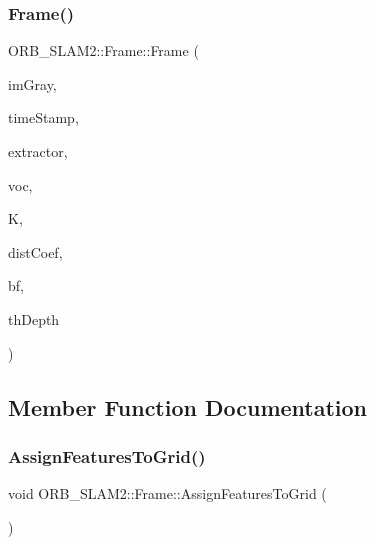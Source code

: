 \mbox{\label{class_o_r_b___s_l_a_m2_1_1_frame_a39a57316938495a9ca8a053edd74b414}} 
\subsubsection{\texorpdfstring{Frame()}{Frame()}\hspace{0.1cm}{\footnotesize\ttfamily [5/5]}}
{\footnotesize\ttfamily O\+R\+B\+\_\+\+S\+L\+A\+M2\+::\+Frame\+::\+Frame (\begin{DoxyParamCaption}\item[{const cv\+::\+Mat \&}]{im\+Gray,  }\item[{const double \&}]{time\+Stamp,  }\item[{\mbox{\hyperlink{class_o_r_b___s_l_a_m2_1_1_o_r_bextractor}{O\+R\+Bextractor}} $\ast$}]{extractor,  }\item[{\mbox{\hyperlink{namespace_o_r_b___s_l_a_m2_a2fafba714858cab1bb18d438e2e83c5d}{O\+R\+B\+Vocabulary}} $\ast$}]{voc,  }\item[{cv\+::\+Mat \&}]{K,  }\item[{cv\+::\+Mat \&}]{dist\+Coef,  }\item[{const float \&}]{bf,  }\item[{const float \&}]{th\+Depth }\end{DoxyParamCaption})}



\subsection{Member Function Documentation}
\mbox{\label{class_o_r_b___s_l_a_m2_1_1_frame_aa3ba21cd44638b322db024cba2b9c19e}} 
\subsubsection{\texorpdfstring{Assign\+Features\+To\+Grid()}{AssignFeaturesToGrid()}}
{\footnotesize\ttfamily void O\+R\+B\+\_\+\+S\+L\+A\+M2\+::\+Frame\+::\+Assign\+Features\+To\+Grid (\begin{DoxyParamCaption}{ }\end{DoxyParamCaption})\hspace{0.3cm}{\ttfamily [private]}}


